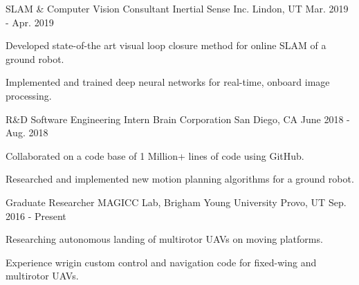 

\begin{cventries}

  \cventry
    {SLAM \& Computer Vision Consultant} %
    {Inertial Sense Inc.} %
    {Lindon, UT} %
    {Mar. 2019 - Apr. 2019} %
    {
      \begin{cvitems} %
        \item {Developed state-of-the art visual loop closure method for online
            SLAM of a ground robot.}
        \item {Implemented and trained deep neural networks for real-time,
          onboard image processing.}
      \end{cvitems}
    }

  \cventry
    {R\&D Software Engineering Intern} %
    {Brain Corporation} %
    {San Diego, CA} %
    {June 2018 - Aug. 2018} %
    {
      \begin{cvitems} %
        \item {Collaborated on a code base of 1 Million+ lines of code using
          GitHub.}
        \item {Researched and implemented new motion planning algorithms for a
          ground robot.}
      \end{cvitems}
    }

  \cventry
    {Graduate Researcher} %
    {MAGICC Lab, Brigham Young University} %
    {Provo, UT} %
    {Sep. 2016 - Present} %
    {
      \begin{cvitems} %
        \item {Researching autonomous landing of multirotor UAVs on moving
          platforms.}
        \item {Experience wrigin custom control and navigation code for
          fixed-wing and multirotor UAVs.}
      \end{cvitems}
    }


\end{cventries}
